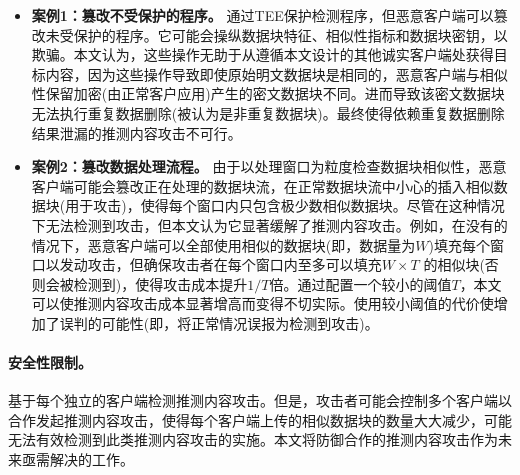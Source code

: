 \begin{itemize}[leftmargin=0em]
    \item \textbf{案例1：篡改不受保护的程序。}
          \sysnameF 通过TEE保护检测程序，但恶意客户端可以篡改未受保护的程序。它可能会操纵数据块特征、相似性指标和数据块密钥，以欺骗\sysnameF。本文认为，这些操作无助于从遵循本文设计的其他诚实客户端处获得目标内容，因为这些操作导致即使原始明文数据块是相同的，恶意客户端与相似性保留加密(由正常客户应用)产生的密文数据块不同。进而导致该密文数据块无法执行重复数据删除(被认为是非重复数据块)。最终使得依赖重复数据删除结果泄漏的推测内容攻击不可行。
    \item \textbf{案例2：篡改数据处理流程。}
          由于\sysnameF 以处理窗口为粒度检查数据块相似性，恶意客户端可能会篡改正在处理的数据块流，在正常数据块流中小心的插入相似数据块(用于攻击)，使得每个窗口内只包含极少数相似数据块。尽管\sysnameF 在这种情况下无法检测到攻击，但本文认为它显著缓解了推测内容攻击。例如，在没有\sysnameF 的情况下，恶意客户端可以全部使用相似的数据块(即，数据量为$W$)填充每个窗口以发动攻击，但\sysnameF 确保攻击者在每个窗口内至多可以填充$W\times T$ 的相似块(否则会被检测到)，使得攻击成本提升$1/T$倍。通过配置一个较小的阈值$T$，本文可以使推测内容攻击成本显著增高而变得不切实际。使用较小阈值的代价使增加了误判的可能性(即，将正常情况误报为检测到攻击)。
\end{itemize}

\paragraph*{安全性限制。}\sysnameF 基于每个独立的客户端检测推测内容攻击。但是，攻击者可能会控制多个客户端以合作发起推测内容攻击，使得每个客户端上传的相似数据块的数量大大减少，\sysnameF 可能无法有效检测到此类推测内容攻击的实施。本文将防御合作的推测内容攻击作为未来亟需解决的工作。